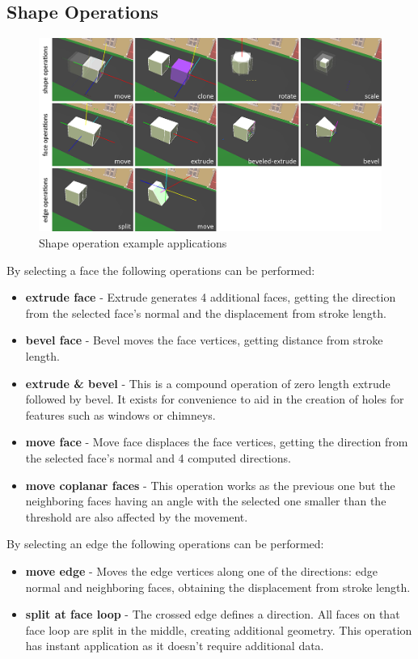\subsection{Shape Operations}

\begin{figure}[ht]
	\centering
		\includegraphics[width=\textwidth]{gfx/ops.png}
	\caption{Shape operation example applications}
	\label{fig:ops}
\end{figure}


By selecting a face the following operations can be performed:
\begin{itemize}
	\item \textbf{extrude face} - Extrude generates 4 additional faces, getting the direction from the selected face's normal and the displacement from stroke length.
	\item	\textbf{bevel face} - Bevel moves the face vertices, getting distance from stroke length.
	\item	\textbf{extrude \& bevel} - This is a compound operation of zero length extrude followed by bevel. It exists for convenience to aid in the creation of holes for features such as windows or chimneys.
	\item	\textbf{move face} - Move face displaces the face vertices, getting the direction from the selected face's normal and 4 computed directions.
	\item	\textbf{move coplanar faces} - This operation works as the previous one but the neighboring faces having an angle with the selected one smaller than the threshold are also affected by the movement.
\end{itemize}

By selecting an edge the following operations can be performed:
\begin{itemize}
	\item \textbf{move edge} - Moves the edge vertices along one of the directions: edge normal and neighboring faces, obtaining the displacement from stroke length.
	\item	\textbf{split at face loop} - The crossed edge defines a direction. All faces on that face loop are split in the middle, creating additional geometry. This operation has instant application as it doesn't require additional data.
\end{itemize}

